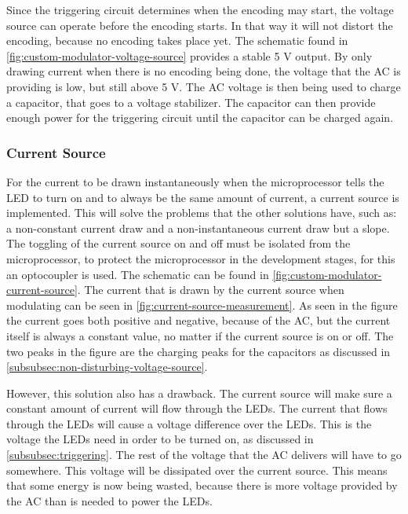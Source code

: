 	Since the triggering circuit determines when the encoding may start, the voltage source can operate before the encoding starts.
	In that way it will not distort the encoding, because no encoding takes place yet.
	The schematic found in \autoref{fig:custom-modulator-voltage-source} provides a stable 5 V output.
	By only drawing current when there is no encoding being done, the voltage that the AC is providing is low, but still above 5 V.
	The AC voltage is then being used to charge a capacitor, that goes to a voltage stabilizer.
	The capacitor can then provide enough power for the triggering circuit until the capacitor can be charged again.





	\subsubsection{Current Source}
	\label{subsubsec:current-source}


	For the current to be drawn instantaneously when the microprocessor tells the LED to turn on and to always be the same amount of current, a current source is implemented. 
	This will solve the problems that the other solutions have, such as: a non-constant current draw and a non-instantaneous current draw but a slope.
	The toggling of the current source on and off must be isolated from the microprocessor, to protect the microprocessor in the development stages, for this an optocoupler is used.
	The schematic can be found in \autoref{fig:custom-modulator-current-source}.
	The current that is drawn by the current source when modulating can be seen in \autoref{fig:current-source-measurement}.
	As seen in the figure the current goes both positive and negative, because of the AC, but the current itself is always a constant value, no matter if the current source is on or off.
	The two peaks in the figure are the charging peaks for the capacitors as discussed in \autoref{subsubsec:non-disturbing-voltage-source}.


	However, this solution also has a drawback.
	The current source will make sure a constant amount of current will flow through the LEDs.
	The current that flows through the LEDs will cause a voltage difference over the LEDs.
	This is the voltage the LEDs need in order to be turned on, as discussed in \autoref{subsubsec:triggering}.
	The rest of the voltage that the AC delivers will have to go somewhere.
	This voltage will be dissipated over the current source.
	This means that some energy is now being wasted, because there is more voltage provided by the AC than is needed to power the LEDs.

